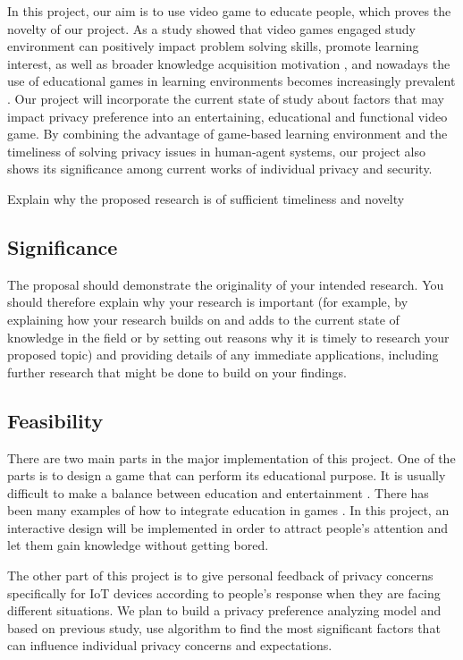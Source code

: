 \documentclass[a4paper,11pt]{article}
\begin{document}
In this project, our aim is to use video game to educate people, which proves the novelty of our project. As a study showed that video games engaged study environment can positively impact problem solving skills, promote learning interest, as well as broader knowledge acquisition motivation \cite{unknown}, and nowadays the use of educational games in learning environments becomes increasingly prevalent \cite{Moreno}. Our project will incorporate the current state of study about factors that may impact privacy preference into an entertaining, educational and functional video game. By combining the advantage of game-based learning environment and the timeliness of solving privacy issues in human-agent systems, our project also shows its significance among current works of individual privacy and security.

\if
Explain why the proposed research is of sufficient timeliness and novelty

\subsection{Significance}

The proposal should demonstrate the originality of your intended research. You should therefore explain why your research is important (for example, by explaining how your research builds on and adds to the current state of knowledge in the field or by setting out reasons why it is timely to research your proposed topic) and providing details of any immediate applications, including further research that might be done to build on your findings.
\fi
\subsection{Feasibility}
There are two main parts in the major implementation of this project. One of the parts is to design a game that can perform its educational purpose. It is usually difficult to make a balance between education and entertainment \cite{Moreno}. There has been many examples of how to integrate education in games \cite{KIM2009800,CHENG2012669}. In this project, an interactive design will be implemented in order to attract people's attention and let them gain knowledge without getting bored.

The other part of this project is to give personal feedback of privacy concerns specifically for IoT devices according to people's response when they are facing different situations. We plan to build a privacy preference analyzing model and based on previous study, use algorithm to find the most significant factors that can influence individual privacy concerns and expectations.
\end{document}
